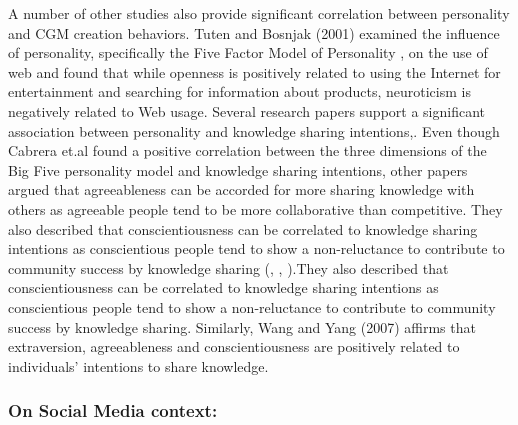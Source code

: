 A number of other studies also provide significant correlation between personality and CGM creation behaviors. Tuten and Bosnjak (2001) examined the influence of personality, specifically the Five Factor Model of Personality \cite{goldberg1990alternative}, on the use of web and found that while openness is positively related to using the Internet for entertainment and searching for information about products, neuroticism is negatively related to Web usage. Several research papers support a significant association between personality and knowledge sharing intentions\cite{cabrera2006determinants}\cite{wang2007personality},\cite{matzler2011personality}\cite{yoo2011influence}. Even though Cabrera et.al found a positive correlation between the three dimensions of the Big Five personality model \cite{goldberg1990alternative} and knowledge sharing intentions, other papers argued that agreeableness can be accorded for more sharing knowledge with others as agreeable people tend to be more collaborative than competitive. They also described that conscientiousness can be correlated to knowledge sharing intentions as conscientious people tend to show a non-reluctance to contribute to community success by knowledge sharing (\cite{matzler2011personality},  \cite{barrick1991big}, \cite{liao2004multilevel}).They also described that conscientiousness can be correlated to knowledge sharing intentions as conscientious people tend to show a non-reluctance to contribute to community success by knowledge sharing. Similarly, Wang and Yang (2007) affirms that extraversion, agreeableness and conscientiousness are positively related to individuals’ intentions to share knowledge\cite{wang2007personality}.


\subsubsection{On Social Media context: }

